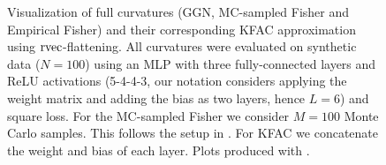 \begin{figure}[t!]
\begin{minipage}[t]{0.485\linewidth}
  \end{minipage}
    \caption{Visualization of full curvatures (GGN, MC-sampled Fisher and Empirical Fisher) and their corresponding KFAC approximation using $\operatorname{rvec}$-flattening. All curvatures were evaluated on synthetic data ($N = 100$) using an MLP with three fully-connected layers and ReLU activations (5-4-4-3, our notation considers applying the weight matrix and adding the bias as two layers, hence $L=6$) and square loss. For the MC-sampled Fisher we consider $M = 100$ Monte Carlo samples. This follows the setup in . For KFAC we concatenate the weight and bias of each layer. 
    Plots produced with .}
    \label{fig:rvec-kfac-full-comparison}
\end{figure}

\switchcolumn[0]


